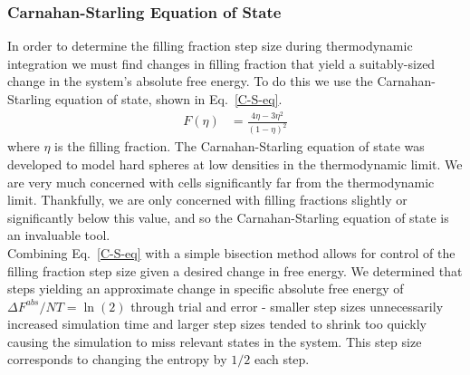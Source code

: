 \documentclass[12pt]{article}
\newcommand{\ignore}[1]{}
\begin{document}
\subsubsection{Carnahan-Starling Equation of State}
In order to determine the filling fraction step size during thermodynamic integration we must find changes in filling fraction that yield a suitably-sized change in the system's absolute free energy. To do this we use the Carnahan-Starling equation of state, shown in Eq.~\ref{C-S-eq}.
\begin{align}
    F(\eta) &= \frac{4\eta - 3\eta^2}{(1-\eta)^2}   
    \label{C-S-eq}  
\end{align} 
where $\eta$ is the filling fraction. The Carnahan-Starling equation of state was developed to model hard spheres at low densities in the thermodynamic limit. We are very much concerned with cells significantly far from the thermodynamic limit. Thankfully, we are only concerned with filling fractions slightly or significantly below this value, and so the Carnahan-Starling equation of state is an invaluable tool.\\
Combining Eq.~\ref{C-S-eq} with a simple bisection method allows for control of the filling fraction step size given a desired change in free energy. We determined that steps yielding an approximate change in specific absolute free energy of $\Delta F^{abs}/NT = \ln(2)$ through trial and error - smaller step sizes unnecessarily increased simulation time and larger step sizes tended to shrink too quickly causing the simulation to miss relevant states in the system. This step size corresponds to changing the entropy by $1/2$ each step. 

\ignore{NB: is there a more physical reason we chose this filling fraction increase?}
\end{document}
